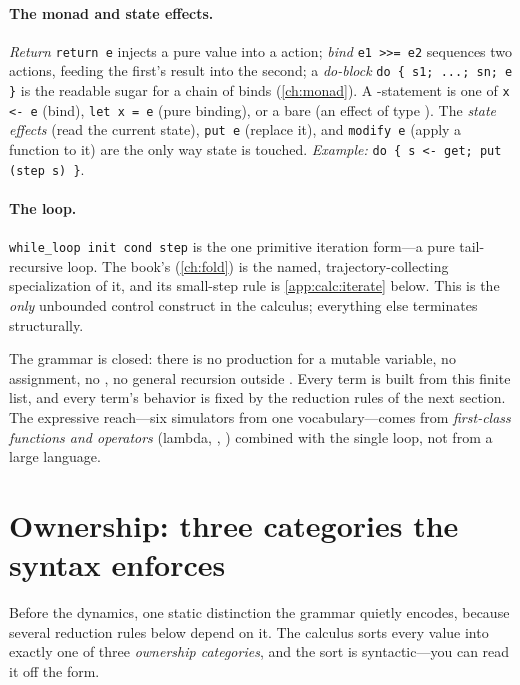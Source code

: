 \paragraph{The monad and state effects.} \emph{Return}
\lstinline[style=l4style]|return e| injects a pure value into a 
action; \emph{bind} \lstinline[style=l4style]|e1 >>= e2| sequences two actions,
feeding the first's result into the second; a \emph{do-block}
\lstinline[style=l4style]|do { s1; ...; sn; e }| is the readable sugar for a chain
of binds (\cref{ch:monad}). A -statement  is one of
\lstinline[style=l4style]|x <- e| (bind), \lstinline[style=l4style]|let x = e|
(pure binding), or a bare  (an effect of type ). The
\emph{state effects}  (read the current state), \lstinline[style=l4style]|put e|
(replace it), and \lstinline[style=l4style]|modify e| (apply a function to it) are
the only way state is touched. \emph{Example:}
\lstinline[style=l4style]|do { s <- get; put (step s) }|.

\paragraph{The loop.} \lstinline[style=l4style]|while_loop init cond step| is the
one primitive iteration form---a pure tail-recursive loop. The book's
 (\cref{ch:fold}) is the named, trajectory-collecting
specialization of it, and its small-step rule is \cref{app:calc:iterate} below.
This is the \emph{only} unbounded control construct in the calculus; everything
else terminates structurally.

\begin{keyidea}
The grammar is closed: there is no production for a mutable variable, no
assignment, no , no general recursion outside .
Every term is built from this finite list, and every term's behavior is fixed by
the reduction rules of the next section. The expressive reach---six simulators
from one vocabulary---comes from \emph{first-class functions and operators}
(lambda, , ) combined with the single loop, not from a large
language.
\end{keyidea}

\section{Ownership: three categories the syntax enforces}
\label{app:calc:ownership}

Before the dynamics, one static distinction the grammar quietly encodes, because
several reduction rules below depend on it. The calculus sorts every value into
exactly one of three \emph{ownership categories}, and the sort is syntactic---you
can read it off the form.

